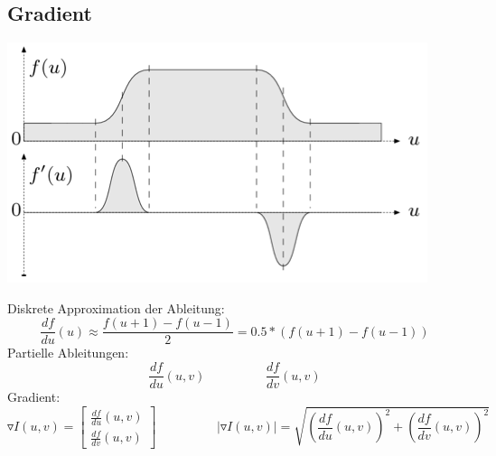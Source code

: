 \documentclass[10pt]{article}
\begin{document}
\subsection{Gradient}
\begin{center}
	\includegraphics[scale=0.4]{ableitung.png}
\end{center}
Diskrete Approximation der Ableitung:
\begin{equation*}
	\frac{df}{du} (u) \approx \frac{f(u+1) - f(u-1)}{2} = 0.5 * (f(u+1) - f(u-1))
\end{equation*}
Partielle Ableitungen:
\begin{equation*}
	\frac{df}{du} (u, v) \hspace{2cm} \frac{df}{dv} (u, v)
\end{equation*}
Gradient:
\begin{equation*}
	\triangledown I(u,v) = \begin{bmatrix}
	\frac{df}{du} (u, v) \\ \frac{df}{dv} (u, v)
	\end{bmatrix} \hspace{2cm} | \triangledown I(u,v)  | = \sqrt{\left( \frac{df}{du} (u, v) \right)^2 + \left( \frac{df}{dv} (u, v) \right)^2}
\end{equation*}
\end{document}
